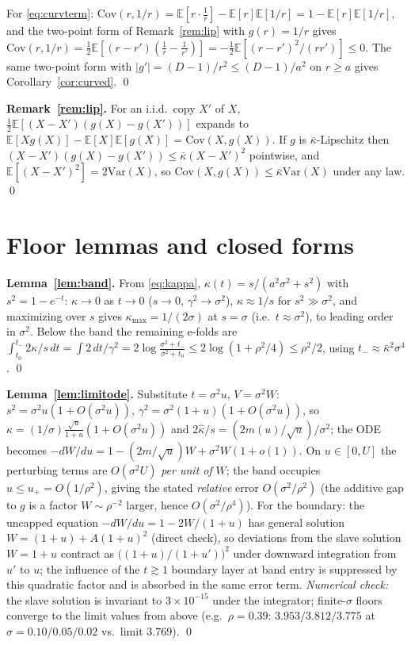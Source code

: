 \documentclass[11pt]{article}
\theoremstyle{remark}
\newcommand{\kb}{\bar\kappa}
\newcommand{\E}{\mathbb{E}}
\newcommand{\Var}{\mathrm{Var}}
\newcommand{\Cov}{\mathrm{Cov}}
\newcommand{\sigsq}{\sigma^2}
\begin{document}
For \eqref{eq:curvterm}: $\Cov(r,1/r)=\E[r\cdot\tfrac1r]-\E[r]\E[1/r]=1-\E[r]\E[1/r]$, and
the two-point form of Remark~\ref{rem:lip} with $g(r)=1/r$ gives
$\Cov(r,1/r)=\tfrac12\E[(r-r')(\tfrac1r-\tfrac1{r'})]=-\tfrac12\E[(r-r')^2/(rr')]\le0$.
The same two-point form with $|g'|=(D-1)/r^2\le(D-1)/a^2$ on $r\ge a$ gives
Corollary~\ref{cor:curved}. \qed

\textbf{Remark~\ref{rem:lip}.} For an i.i.d.\ copy $X'$ of $X$,
$\tfrac12\E[(X-X')(g(X)-g(X'))]$ expands to $\E[Xg(X)]-\E[X]\E[g(X)]=\Cov(X,g(X))$. If $g$
is $\kb$-Lipschitz then $(X-X')(g(X)-g(X'))\le\kb(X-X')^2$ pointwise, and
$\E[(X-X')^2]=2\Var(X)$, so $\Cov(X,g(X))\le\kb\Var(X)$ under any law. \qed

\section{Floor lemmas and closed forms}\label{app:floor}

\textbf{Lemma~\ref{lem:band}.} From \eqref{eq:kappa}, $\kappa(t)=s/(a^2\sigsq+s^2)$
with $s^2=1-e^{-t}$: $\kappa\to0$ as $t\to0$ ($s\to0$, $\gamma^2\to\sigsq$),
$\kappa\approx1/s$ for $s^2\gg\sigsq$, and maximizing over $s$ gives
$\kappa_{\max}=1/(2\sigma)$ at $s=\sigma$ (i.e.\ $t\approx\sigsq$), to leading order in
$\sigsq$. Below the band the remaining e-folds are
$\int_{t_0}^{t_-}2\kappa/s\,dt=\int 2\,dt/\gamma^2=2\log\frac{\sigsq+t_-}{\sigsq+t_0}
\le2\log(1+\rho^2/4)\le\rho^2/2$, using $t_-\approx\kb^2\sigma^4$. \qed

\textbf{Lemma~\ref{lem:limitode}.} Substitute $t=\sigsq u$, $V=\sigsq W$:
$s^2=\sigsq u(1+O(\sigsq u))$, $\gamma^2=\sigsq(1+u)(1+O(\sigsq u))$, so
$\kappa=(1/\sigma)\frac{\sqrt u}{1+u}(1+O(\sigsq u))$ and
$2\hat\kappa/s=(2m(u)/\sqrt u)/\sigsq$; the ODE becomes
$-dW/du=1-(2m/\sqrt u)W+\sigsq W(1+o(1))$. On $u\in[0,U]$ the perturbing terms are
$O(\sigsq U)$ \emph{per unit of} $W$; the band occupies $u\le u_+=O(1/\rho^2)$, giving
the stated \emph{relative} error $O(\sigsq/\rho^2)$ (the additive gap to $g$ is a factor
$W\sim\rho^{-2}$ larger, hence $O(\sigsq/\rho^4)$). For the boundary: the uncapped equation
$-dW/du=1-2W/(1+u)$ has general solution $W=(1+u)+A(1+u)^2$ (direct check), so
deviations from the slave solution $W=1+u$ contract as $\big((1+u)/(1+u')\big)^2$ under
downward integration from $u'$ to $u$; the influence of the $t\gtrsim1$ boundary layer
at band entry is suppressed by this quadratic factor and is absorbed in the same error
term. \emph{Numerical check:} the slave solution is invariant to $3\times10^{-15}$ under
the integrator; finite-$\sigma$ floors converge to the limit values from above
(e.g.\ $\rho=0.39$: $3.953/3.812/3.775$ at $\sigma=0.10/0.05/0.02$ vs.\ limit $3.769$).
\qed
\end{document}

